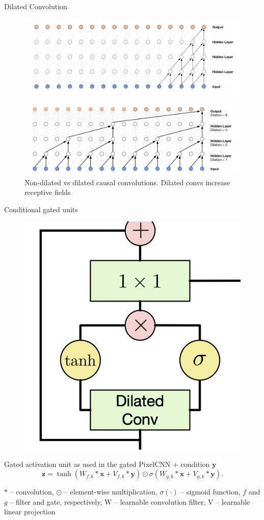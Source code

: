 \begin{frame}{Dilated Convolution}
    \begin{figure}
    	\centering
    	\includegraphics[width=0.9\linewidth]{figs/dilated_conv.png}
    	\caption{Non-dilated vs dilated causal convolutions. Dilated convs increase receptive fields}
    \end{figure}
\end{frame}
\begin{frame}{Conditional gated units}
    \begin{figure}
    	\centering
    	\includegraphics[width=0.35\linewidth]{figs/wavenet_gate.png}
    \end{figure}
    Gated activation unit as used in the gated PixelCNN + condition $\mathbf{y}$
    $$\mathbf{z}=\operatorname{tanh}\left(W_{f,k}*\mathbf{x}+V_{f,k}*\mathbf{y}\right)\odot\sigma\left(W_{g,k}*\mathbf{x}+V_{g,k}*\mathbf{y}\right).$$
    
    $*$ -- convolution, $\odot$ -- element-wise multiplication, $\sigma (\cdot)$ -- sigmoid function, $f$ and $g$ -- filter and gate, respectively, W -- learnable convolution filter, V -- learnable linear projection
\end{frame}

